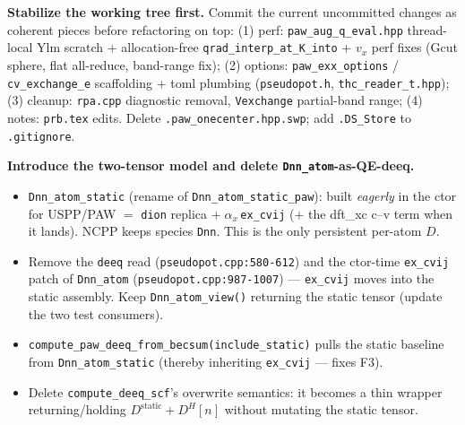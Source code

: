 \documentclass[11pt]{article}
\newcommand{\code}[1]{\texttt{\small #1}}
\newcommand{\file}[1]{\texttt{\small #1}}
\newcommand{\Dstat}{D^{\mathrm{static}}}
\begin{document}
\begin{description}[leftmargin=2.6em,style=nextline]
\item[A0.] \textbf{Stabilize the working tree first.} Commit the current
uncommitted changes as coherent pieces before refactoring on top:
(1) perf: \file{paw\_aug\_q\_eval.hpp} thread-local Ylm scratch +
allocation-free \code{qrad\_interp\_at\_K\_into} + $v_x$ perf fixes (Gcut
sphere, flat all-reduce, band-range fix);
(2) options: \code{paw\_exx\_options} / \code{cv\_exchange\_e} scaffolding +
toml plumbing (\file{pseudopot.h}, \file{thc\_reader\_t.hpp});
(3) cleanup: \file{rpa.cpp} diagnostic removal, \code{Vexchange}
partial-band range;
(4) notes: \file{prb.tex} edits.
Delete \file{.paw\_onecenter.hpp.swp}; add \file{.DS\_Store} to
\file{.gitignore}.

\item[A1.] \textbf{Introduce the two-tensor model and delete
\code{Dnn\_atom}-as-QE-deeq.}
\begin{itemize}[leftmargin=1.4em]
\item \code{Dnn\_atom\_static} (rename of \code{Dnn\_atom\_static\_paw}):
built \emph{eagerly} in the ctor for USPP/PAW $=$ \code{dion} replica
$+\;\alpha_x\,$\code{ex\_cvij} ($+$ the dft\_xc c--v term when it lands).
NCPP keeps species \code{Dnn}. This is the only persistent per-atom $D$.
\item Remove the \code{deeq} read (\code{pseudopot.cpp:580-612}) and the
ctor-time \code{ex\_cvij} patch of \code{Dnn\_atom}
(\code{pseudopot.cpp:987-1007}) --- \code{ex\_cvij} moves into the static
assembly. Keep \code{Dnn\_atom\_view()} returning the static tensor (update
the two test consumers).
\item \code{compute\_paw\_deeq\_from\_becsum(include\_static)} pulls the
static baseline from \code{Dnn\_atom\_static} (thereby inheriting
\code{ex\_cvij} --- fixes F3).
\item Delete \code{compute\_deeq\_scf}'s overwrite semantics: it becomes a
thin wrapper returning/holding $\Dstat + D^H[n]$ without mutating the
static tensor.
\end{itemize}


\end{description}
\end{document}
